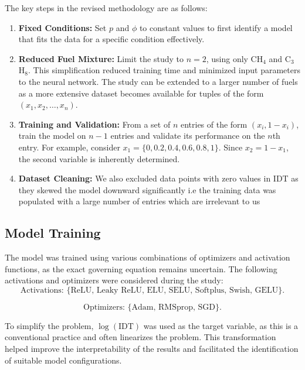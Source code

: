 \documentclass[12pt]{report}
\begin{document}
The key steps in the revised methodology are as follows:
\begin{enumerate}
    \item \textbf{Fixed Conditions:} 
    \newline
    Set $p$ and $\phi$ to constant values to first identify a model that fits the data for a specific condition effectively.
    \item \textbf{Reduced Fuel Mixture:} 
    \newline
    Limit the study to $n=2$, using only CH$_4$ and C$_3$H$_8$. This simplification reduced training time and minimized input parameters to the neural network. The study can be extended to a larger number of fuels as a more extensive dataset becomes available for tuples of the form $(x_1, x_2, \ldots, x_n)$.
    \item \textbf{Training and Validation:} 
    \newline 
    From a set of $n$ entries of the form $(x_i, 1-x_i)$, train the model on $n-1$ entries and validate its performance on the $n$th entry. For example, consider $x_1 = \{0, 0.2, 0.4, 0.6, 0.8, 1\}$. Since $x_2 = 1 - x_1$, the second variable is inherently determined.
    \item  \textbf{Dataset Cleaning:}
    \newline
    We also excluded data points with zero values in IDT as they skewed the model downward significantly i.e the training data was populated with a large number of entries which are irrelevant to us
\end{enumerate}

\subsection{Model Training}

The model was trained using various combinations of optimizers and activation functions, as the exact governing equation remains uncertain. The following activations and optimizers were considered during the study:
\[
\text{Activations: } \{\text{ReLU, Leaky ReLU, ELU, SELU, Softplus, Swish, GELU}\}.
\]

\[
\text{Optimizers: } \{\text{Adam, RMSprop, SGD}\}.
\]

To simplify the problem, $\log(\text{IDT})$ was used as the target variable, as this is a conventional practice and often linearizes the problem. This transformation helped improve the interpretability of the results and facilitated the identification of suitable model configurations.
\end{document}
